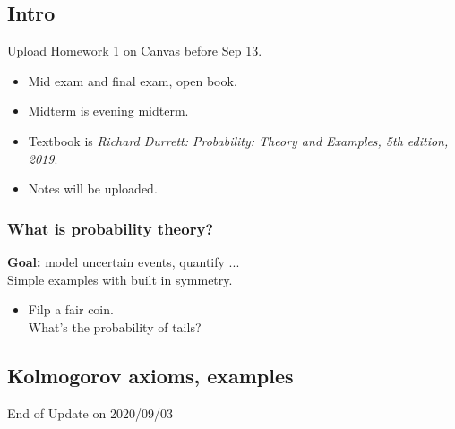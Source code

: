 \documentclass{article}
\begin{document}
    \subsection{Intro}
    Upload Homework 1 on Canvas before Sep 13.
    \begin{itemize}
        \item Mid exam and final exam, open book.
        \item Midterm is evening midterm.
        \item Textbook is \textit{Richard Durrett: Probability: Theory and Examples, 5th edition, 2019}.
        \item Notes will be uploaded.
    \end{itemize}

    \subsubsection{What is probability theory?}
    \textbf{Goal:} model uncertain events, quantify ...\\
    Simple examples with built in symmetry.\\
    \begin{itemize}
        \item Filp a fair coin.\\
                What's the probability of tails?\\
    \end{itemize}
    

    \subsection{Kolmogorov axioms, examples}
    

\begin{center}
    \footnotesize End of Update on 2020/09/03
\end{center}

\end{document}
